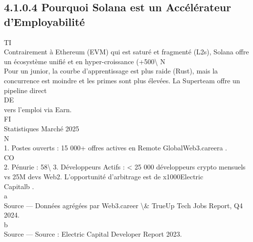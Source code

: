 \documentclass[12pt,landscape,a4paper]{article}
\begin{document}
\subsection{4.1.0.4 Pourquoi Solana est un Accélérateur d’Employabilité}
\vspace{0.5em}
\vspace{0.5em}
\vspace{0.5em}
\vspace{0.5em}
TI\\
Contrairement à Ethereum (EVM) qui est saturé et fragmenté (L2s), Solana offre un écosystème unifié et en hyper-croissance (+500\textbackslash{}%
\vspace{0.5em}
\vspace{0.5em}
\vspace{0.5em}
\vspace{0.5em}
N\\
Pour un junior, la courbe d’apprentissage est plus raide (Rust), mais la concurrence est moindre et les primes sont plus élevées. La Superteam offre un pipeline direct\\
\vspace{0.5em}
\vspace{0.5em}
\vspace{0.5em}
\vspace{0.5em}
DE\\
vers l’emploi via Earn.\\
\vspace{0.5em}
\vspace{0.5em}
\vspace{0.5em}
\vspace{0.5em}
FI\\
Statistiques Marché 2025\\
\vspace{0.5em}
\vspace{0.5em}
\vspace{0.5em}
\vspace{0.5em}
N\\
1. Postes ouverts : 15 000+ offres actives en Remote GlobalWeb3.careera .\\
CO\\
2. Pénurie : 58\textbackslash{}%
\vspace{0.5em}
3. Développeurs Actifs : \textless{} 25 000 développeurs crypto mensuels vs 25M devs Web2. L'opportunité d'arbitrage est de x1000Electric\\
Capitalb .\\
a\\
Source --- Données agrégées par Web3.career \textbackslash{}& TrueUp Tech Jobs Report, Q4 2024.\\
b\\
Source --- Source : Electric Capital Developer Report 2023.\\
\vspace{0.5em}
\vspace{0.5em}
\vspace{0.5em}
\vspace{0.5em}
\end{document}
